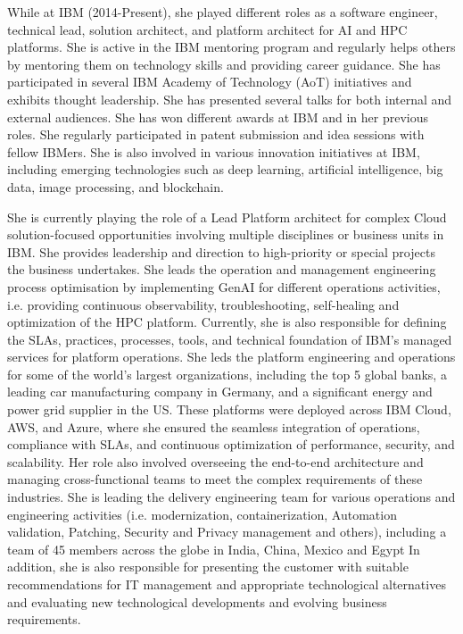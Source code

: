 \documentclass[12pt,]{scrartcl}
\begin{document}
While at IBM (2014-Present), she played different roles as a software engineer, technical lead, solution architect, and platform architect for AI and HPC platforms. She is active in the IBM mentoring program and regularly helps others by mentoring them on technology skills and providing career guidance. She has participated in several IBM Academy of Technology (AoT) initiatives and exhibits thought leadership. She has presented several talks for both internal and external audiences. She has won different awards at IBM and in her previous roles. She regularly participated in patent submission and idea sessions with fellow IBMers. She is also involved in various innovation initiatives at IBM, including emerging technologies such as deep learning, artificial intelligence, big data, image processing, and blockchain.

She is currently playing the role of a Lead Platform architect for complex Cloud solution-focused opportunities involving multiple disciplines or business units in IBM. She provides leadership and direction to high-priority or special projects the business undertakes. She leads the operation and management engineering process optimisation by implementing GenAI for different operations activities, i.e. providing continuous observability, troubleshooting, self-healing and optimization of the HPC platform. Currently, she is also responsible for defining the SLAs, practices, processes, tools, and technical foundation of IBM's managed services for platform operations. She leds the platform engineering and operations for some of the world's largest organizations, including the top 5 global banks, a leading car manufacturing company in Germany, and a significant energy and power grid supplier in the US. These platforms were deployed across IBM Cloud, AWS, and Azure, where she ensured the seamless integration of operations, compliance with SLAs, and continuous optimization of performance, security, and scalability. Her role also involved overseeing the end-to-end architecture and managing cross-functional teams to meet the complex requirements of these industries. She is leading the delivery engineering team for various operations and engineering activities (i.e. modernization, containerization, Automation validation, Patching, Security and Privacy management and others), including a team of 45 members across the globe in India, China, Mexico and Egypt In addition, she is also responsible for presenting the customer with suitable recommendations for IT management and appropriate technological alternatives and evaluating new technological developments and evolving business requirements.
\end{document}

